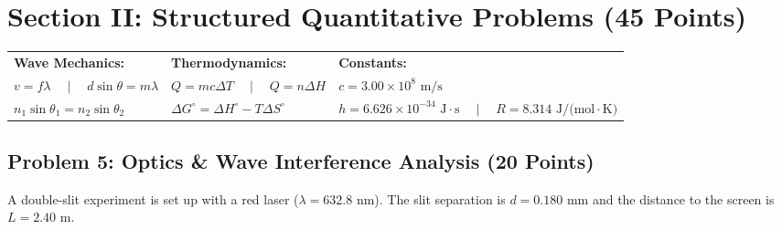 \documentclass[11pt,a4paper]{article}
\begin{document}
\newpage

\section{Section II: Structured Quantitative Problems (45 Points)}

\begin{tcolorbox}[formulabox]
  \scriptsize
  \begin{tabularx}{\textwidth}{X X X}
    \textbf{Wave Mechanics:} & \textbf{Thermodynamics:} & \textbf{Constants:} \\
    $v = f \lambda \quad\mid\quad d \sin\theta = m \lambda$ & $Q = m c \Delta T \quad\mid\quad Q = n \Delta H$ & $c = 3.00 \times 10^8\text{ m/s}$ \\
    $n_1 \sin\theta_1 = n_2 \sin\theta_2$ & $\Delta G^\circ = \Delta H^\circ - T\Delta S^\circ$ & $h = 6.626 \times 10^{-34}\text{ J}\cdot\text{s} \quad\mid\quad R = 8.314\text{ J/(mol}\cdot\text{K)}$
  \end{tabularx}
\end{tcolorbox}

\vspace{0.08cm}

\subsection*{Problem 5: Optics \& Wave Interference Analysis (20 Points)}

A double-slit experiment is set up with a red laser ($\lambda = 632.8\text{ nm}$). The slit separation is $d = 0.180\text{ mm}$ and the distance to the screen is $L = 2.40\text{ m}$.
\end{document}
